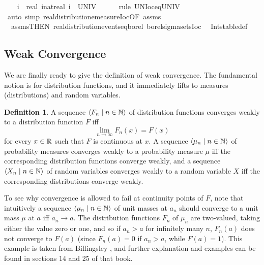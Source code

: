 \documentclass[leqno]{article}
\theoremstyle{definition}
\newtheorem{definition}[theorem]{Definition}
\newcommand{\bldseq}[2]{\langle{#1}\mid{#2}\rangle}
\begin{document}
\begin{isabellebody}
\isanewline
\ \ \isamarkupfalse%
\ {\isachardoublequoteopen}{\isacharparenleft}{\isasymUnion}i{\isachardot}\ {\isacharbraceleft}{\isacharminus}\ real\ {\isacharparenleft}i{\isacharcolon}{\isacharcolon}nat{\isacharparenright}{\isacharless}{\isachardot}{\isachardot}real\ i{\isacharbraceright}{\isacharparenright}\ {\isacharequal}\ UNIV{\isachardoublequoteclose}\isanewline
\ \ \ \ \isamarkupfalse%
\ {\isacharparenleft}rule\ UN{\isacharunderscore}Ioc{\isacharunderscore}eq{\isacharunderscore}UNIV{\isacharparenright}\isanewline
{}\isamarkupfalse%
\ {\isacharparenleft}auto\ simp{\isacharcolon}\ real{\isacharunderscore}distribution{\isachardot}emeasure{\isacharunderscore}Ioc{\isacharbrackleft}OF\ assms{\isacharparenleft}{}{\isacharparenright}{\isacharbrackright}\isanewline
\ \ assms{\isacharparenleft}{}{\isacharcomma}{}{\isacharparenright}{\isacharbrackleft}THEN\ real{\isacharunderscore}distribution{\isachardot}events{\isacharunderscore}eq{\isacharunderscore}borel{\isacharbrackright}\ borel{\isacharunderscore}sigma{\isacharunderscore}sets{\isacharunderscore}Ioc\isanewline
\ \ Int{\isacharunderscore}stable{\isacharunderscore}def{\isacharparenright}%
\end{isabellebody}

\subsection{Weak Convergence}

We are finally ready to give the definition of weak convergence. The fundamental notion is for distribution functions, and it immediately lifts to measures (distributions) and random variables.

\begin{definition}
A sequence $\bldseq{F_n}{n \in \N}$ of distribution functions converges weakly to a distribution function $F$ iff
\[ \lim_{n \rightarrow \infty} F_n(x) = F(x) \]
for every $x \in \mathbb{R}$ such that $F$ is continuous at $x$. A sequence $\bldseq{\mu_n}{n \in \N}$ of probability measures converges weakly to a probability measure $\mu$ iff the corresponding distribution functions converge weakly, and a sequence $\bldseq{X_n}{n \in \N}$ of random variables converges weakly to a random variable $X$ iff the corresponding distributions converge weakly.
\end{definition}

To see why convergence is allowed to fail at continuity points of $F$, note that intuitively a sequence $\bldseq{\mu_n}{n \in \N}$ of unit masses at $a_n$ should converge to a unit mass $\mu$ at $a$ iff $a_n \rightarrow a$. The distribution functions $F_n$ of $\mu_n$ are two-valued, taking either the value zero or one, and so if $a_n > a$ for infinitely many $n$, $F_n(a)$ does not converge to $F(a)$ (since $F_n(a) = 0$ if $a_n > a$, while $F(a) = 1$). This example is taken from Billingsley \cite{billingsley}, and further explanation and examples can be found in sections 14 and 25 of that book.
\end{document}
